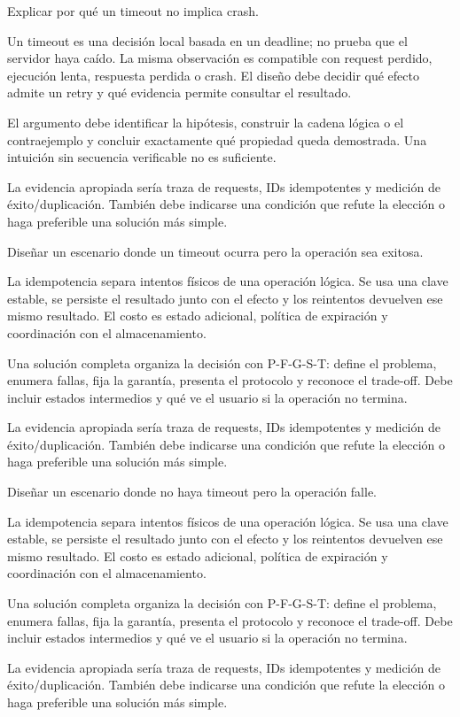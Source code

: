 \documentclass[variant=guia,cover=institutional,mode=screen]{ua-engineering-v6-article}
\begin{document}
\begin{uaexercise}
Explicar por qué un timeout no implica crash.
\end{uaexercise}
\begin{uaanswer}
Un timeout es una decisión local basada en un deadline; no prueba que el servidor haya caído. La misma observación es compatible con request perdido, ejecución lenta, respuesta perdida o crash. El diseño debe decidir qué efecto admite un retry y qué evidencia permite consultar el resultado.

El argumento debe identificar la hipótesis, construir la cadena lógica o el contraejemplo y concluir exactamente qué propiedad queda demostrada. Una intuición sin secuencia verificable no es suficiente.

La evidencia apropiada sería traza de requests, IDs idempotentes y medición de éxito/duplicación. También debe indicarse una condición que refute la elección o haga preferible una solución más simple.
\end{uaanswer}

\begin{uaexercise}
Diseñar un escenario donde un timeout ocurra pero la operación sea exitosa.
\end{uaexercise}
\begin{uaanswer}
La idempotencia separa intentos físicos de una operación lógica. Se usa una clave estable, se persiste el resultado junto con el efecto y los reintentos devuelven ese mismo resultado. El costo es estado adicional, política de expiración y coordinación con el almacenamiento.

Una solución completa organiza la decisión con P-F-G-S-T: define el problema, enumera fallas, fija la garantía, presenta el protocolo y reconoce el trade-off. Debe incluir estados intermedios y qué ve el usuario si la operación no termina.

La evidencia apropiada sería traza de requests, IDs idempotentes y medición de éxito/duplicación. También debe indicarse una condición que refute la elección o haga preferible una solución más simple.
\end{uaanswer}

\begin{uaexercise}
Diseñar un escenario donde no haya timeout pero la operación falle.
\end{uaexercise}
\begin{uaanswer}
La idempotencia separa intentos físicos de una operación lógica. Se usa una clave estable, se persiste el resultado junto con el efecto y los reintentos devuelven ese mismo resultado. El costo es estado adicional, política de expiración y coordinación con el almacenamiento.

Una solución completa organiza la decisión con P-F-G-S-T: define el problema, enumera fallas, fija la garantía, presenta el protocolo y reconoce el trade-off. Debe incluir estados intermedios y qué ve el usuario si la operación no termina.

La evidencia apropiada sería traza de requests, IDs idempotentes y medición de éxito/duplicación. También debe indicarse una condición que refute la elección o haga preferible una solución más simple.
\end{uaanswer}
\end{document}
